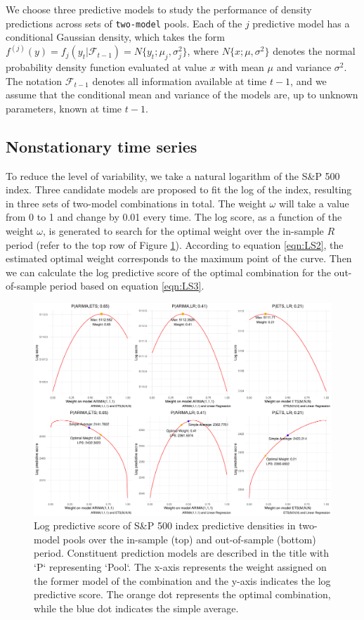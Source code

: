 \documentclass{monashthesis}
\begin{document}
We choose three predictive models to study the performance of density predictions across sets of \texttt{two-model} pools. Each of the \(j\) predictive model has a conditional Gaussian density, which takes the form \(f^{(j)}(y)=f_j(y_t|\mathcal{F}_{t-1})=N\{y_t; \mu_j, \sigma^2_j\}\), where \(N\{x; \mu, \sigma^2\}\) denotes the normal probability density function evaluated at value \(x\) with mean \(\mu\) and variance \(\sigma^2\). The notation \(\mathcal{F}_{t-1}\) denotes all information available at time \(t-1\), and we assume that the conditional mean and variance of the models are, up to unknown parameters, known at time \(t-1\).

\hypertarget{nonstationary-time-series}{%
\subsection{Nonstationary time series}\label{nonstationary-time-series}}

To reduce the level of variability, we take a natural logarithm of the S\&P 500 index. Three candidate models are proposed to fit the log of the index, resulting in three sets of two-model combinations in total. The weight \(\omega\) will take a value from 0 to 1 and change by 0.01 every time. The log score, as a function of the weight \(\omega\), is generated to search for the optimal weight over the in-sample \(R\) period (refer to the top row of Figure \ref{fig:nonstat}). According to equation \ref{eqn:LS2}, the estimated optimal weight corresponds to the maximum point of the curve. Then we can calculate the log predictive score of the optimal combination for the out-of-sample period based on equation \ref{eqn:LS3}.

\begin{figure}[ht]
\centering
\includegraphics[scale=0.45]{figures/SP500_nonstationary.pdf}
\caption{Log predictive score of S\&P 500 index predictive densities in two-model pools over the in-sample (top) and out-of-sample (bottom) period. Constituent prediction models are described in the title with `P` representing `Pool`. The x-axis represents the weight assigned on the former model of the combination and the y-axis indicates the log predictive score. The orange dot represents the optimal combination, while the blue dot indicates the simple average.}
\label{fig:nonstat}
\end{figure}
\end{document}
